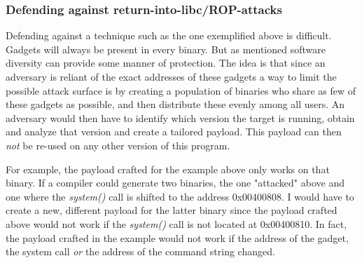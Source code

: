 \subsubsection{Defending against return-into-libc/ROP-attacks}

Defending against a technique such as the one exemplified above is difficult. Gadgets will
always be present in every binary. But as mentioned software diversity can provide some
manner of protection. The idea is that since an adversary is reliant of the exact
addresses of these gadgets a way to limit the possible attack surface is by creating a
population of binaries who share as few of these gadgets as possible, and then distribute
these evenly among all users. An adversary would then have to identify which version the
target is running, obtain and analyze that version and create a tailored payload. This
payload can then \textit{not} be re-used on any other version of this program.

For example, the payload crafted for the example above only works on that binary. If a
compiler could generate two binaries, the one "attacked" above and one where the
\textit{system()} call is shifted to the address 0x00400808. I would have to create a new,
different payload for the latter binary since the payload crafted above would not work if
the \textit{system()} call is not located at 0x00400810. In fact, the payload crafted in
the example would not work if the address of the gadget, the system call \textit{or} the
address of the command string changed.
